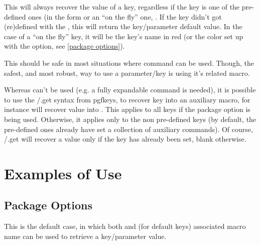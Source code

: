 \documentclass[10pt]{article}
\begin{document}
\begin{codedescribe}{\QuestVal}
\begin{codesyntax}%
\end{codesyntax}
This will always recover the value of a key, regardless if the key is one of the pre-defined ones (in the form  or an ``on the fly'' one, .
If the key didn't got (re)defined with the , this will return the key/parameter default value. In the case of a ``on the fly'' key, it will be the key's name in red (or the color set up with the  option, see \ref{package options}).

This should be safe in most situations where \tsobj{\pgfkeys} command can be used. Though, the safest, and most robust, way to use a parameter/key is using it's related macro.
\end{codedescribe}
\begin{tsremark}
  Whereas \tsobj{\QuestVal} can't be used (e.g. a fully expandable command is needed), it is possible to use the /.get syntax from pgfkeys, to recover key into an auxiliary macro, for instance  will recover  value into \tsobj{\keycmd}. This applies to all keys if the  package option is being used. Otherwise, it applies only to the non pre-defined keys (by default, the pre-defined ones already have set a collection of auxiliary commands).
  Of course, /.get  will recover a value only if the key has already been set, blank otherwise.
\end{tsremark}

\section{Examples of Use}

\subsection{Package Options}
\begin{codestore}
\usepackage{tikzquests}
\end{codestore}

This is the default case, in which both \tsobj{\QuestVal} and (for default keys) associated macro name can be used to retrieve a key/parameter value.
\end{document}
